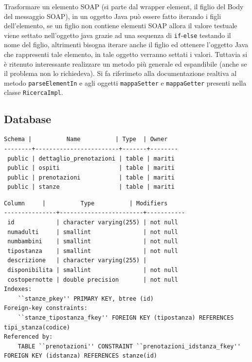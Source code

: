 \documentclass[a4paper]{article}
\begin{document}
Trasformare un elemento SOAP (si parte dal wrapper element, il figlio
del Body del messaggio SOAP), in un oggetto Java pu\`o essere fatto
iterando i figli dell'elemento, se un figlio non contiene elementi
SOAP allora il valore testuale viene settato nell'oggetto java grazie
ad una sequenza di \verb'if'-\verb'else' testando il nome del figlio,
altrimenti bisogna iterare anche il figlio ed ottenere l'oggetto Java
che rappresenti tale elemento, in tale oggetto verranno settati i
valori. Tuttavia si \`e ritenuto interessante realizzare un metodo
pi\`u generale ed espandibile (anche se il problema non lo
richiedeva). Si fa riferimeto alla documentazione realtiva al metodo
\verb'parseElementIn' e agli oggetti \verb'mappaSetter' e
\verb'mappaGetter' presenti nella classe \verb'RicercaImpl'.


\subsection{Database}
\label{sec:dettagli.database}
\lstset{basicstyle=\small, language=Clean, captionpos=b,
  frame=single, breaklines=true}

\begin{lstlisting}[caption=Tabelle]
 Schema |          Name          | Type  | Owner  
--------+------------------------+-------+--------
 public | dettaglio_prenotazioni | table | mariti
 public | ospiti                 | table | mariti
 public | prenotazioni           | table | mariti
 public | stanze                 | table | mariti
\end{lstlisting}

\begin{lstlisting}[caption={Tabella: Stanze}]
    Column     |          Type          | Modifiers 
---------------+------------------------+-----------
 id            | character varying(255) | not null
 numadulti     | smallint               | not null
 numbambini    | smallint               | not null
 tipostanza    | smallint               | not null
 descrizione   | character varying(255) | 
 disponibilita | smallint               | not null
 costopernotte | double precision       | not null
Indexes:
    ``stanze_pkey'' PRIMARY KEY, btree (id)
Foreign-key constraints:
    ``stanze_tipostanza_fkey'' FOREIGN KEY (tipostanza) REFERENCES tipi_stanza(codice)
Referenced by:
    TABLE ``prenotazioni'' CONSTRAINT ``prenotazioni_idstanza_fkey'' FOREIGN KEY (idstanza) REFERENCES stanze(id)
\end{lstlisting}
\end{document}
